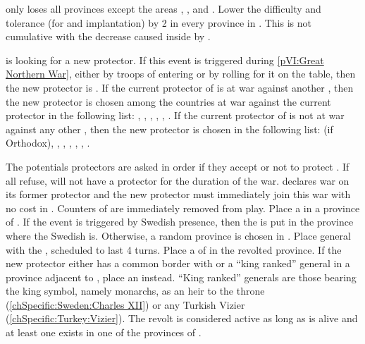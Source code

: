 \phevnt
\aparag \paysmogol only loses all provinces except the areas
\granderegionDelhi, \granderegionAoudh, \granderegionBengale and
\granderegionGondwana.
\aparag Lower the difficulty and tolerance (for \COL and \TP implantation) by
2 in every province in \continentIndia.
\bparag This is not cumulative with the decrease caused inside \paysmogol by
.





\condition{}
\aparag \paysukraine is looking for a new protector.
\bparag If this event is triggered during \ref{pVI:Great Northern War}, either
by troops of \SUE entering \regionUkraine or by rolling for it on the table,
then the new protector is \SUE.
\bparag If the current protector of \paysukraine is at war against another
\MAJ, then the new protector is chosen among the countries at war against the
current protector in the following list: \RUS, \POL, \TUR, \AUS, \SUE, \PRU.
\bparag If the current protector of \paysukraine is not at war against any
other \MAJ, then the new protector is chosen in the following list: \POL (if
Orthodox), \RUS, \TUR, \POL, \AUS, \SUE, \PRU.

\phevnt
\aparag The potentials protectors are asked in order if they accept or not to
protect \paysukraine.
\bparag If all refuse, \paysukraine will not have a protector for the duration
of the war.
\aparag \paysukraine declares war on its former protector and the new
protector must immediately join this war with no cost in \STAB.
\aparag Counters of \paysukraine are immediately removed from play.
\aparag Place a \REVOLT \faceplus in a province of \regionUkraine.
\bparag If the event is triggered by Swedish presence, then the \REVOLT is put
in the province where the Swedish \ARMY is. Otherwise, a random province is
chosen in \paysukraine.
\aparag Place general  with the \REVOLT, scheduled to
last 4 turns.
\aparag Place a \LD of \paysukraine in the revolted province.
\bparag If the new protector either has a common border with \paysukraine or a
``king ranked'' general in a province adjacent to \paysukraine, place an
\ARMY\facemoins instead.
\bparag ``King ranked'' generals are those bearing the king symbol, namely
monarchs,  as an heir to the throne
(\ref{chSpecific:Sweden:Charles XII}) or any Turkish Vizier
(\ref{chSpecific:Turkey:Vizier}).
\aparag The revolt is considered active as long as \leaderMazepa is alive and
at least one \REVOLT exists in one of the provinces of \regionUkraine.

